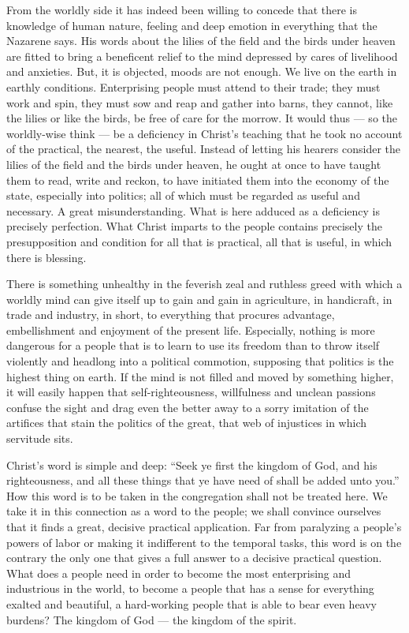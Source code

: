 \documentclass[12pt,a4paper,openany]{book}
\newcommand{\opage}[1]{\marginnote{\footnotesize\textit{[#1]}}}
\begin{document}
From the worldly side it has indeed been willing to concede that there is knowledge of human nature, feeling and deep emotion in everything that the Nazarene says. His words about the lilies of the field and the birds under heaven are fitted to bring a beneficent relief to the mind depressed by cares of livelihood and anxieties. But, it is objected, moods are not enough. We live on the earth in earthly conditions. Enterprising people must attend to their trade; they must work and spin, they must sow and reap and gather into barns, they cannot, like the lilies or like the birds, be free of care for the morrow. It would thus --- so the worldly-wise think --- be a deficiency in Christ's teaching that he took no account of the practical, the nearest, the useful. Instead of letting his hearers consider the lilies of the field and the birds under heaven, he ought at once to have taught them to read, write and reckon, to have initiated them into the economy of the state, especially into politics; all of which must be regarded as useful and necessary. A great misunderstanding. What is here adduced as a deficiency is precisely perfection. What Christ imparts to the people contains precisely the presupposition and condition for all that is practical, all that is useful, in which there is blessing.

There is something unhealthy in the feverish zeal and ruthless greed with which a worldly mind can give itself up to gain and gain in agriculture, in handicraft, in trade and industry, in short, to everything that procures advantage, embellishment and enjoyment of the present
\setcounter{footnote}{0}%
\opage{27}life. Especially, nothing is more dangerous for a people that is to learn to use its freedom than to throw itself violently and headlong into a political commotion, supposing that politics is the highest thing on earth. If the mind is not filled and moved by something higher, it will easily happen that self-righteousness, willfulness and unclean passions confuse the sight and drag even the better away to a sorry imitation of the artifices that stain the politics of the great, that web of injustices in which servitude sits.

Christ's word is simple and deep: ``Seek ye first the kingdom of God, and his righteousness, and all these things that ye have need of shall be added unto you.'' How this word is to be taken in the congregation shall not be treated here. We take it in this connection as a word to the people; we shall convince ourselves that it finds a great, decisive practical application. Far from paralyzing a people's powers of labor or making it indifferent to the temporal tasks, this word is on the contrary the only one that gives a full answer to a decisive practical question. What does a people need in order to become the most enterprising and industrious in the world, to become a people that has a sense for everything exalted and beautiful, a hard-working people that is able to bear even heavy burdens? The kingdom of God --- the kingdom of the spirit.
\end{document}
